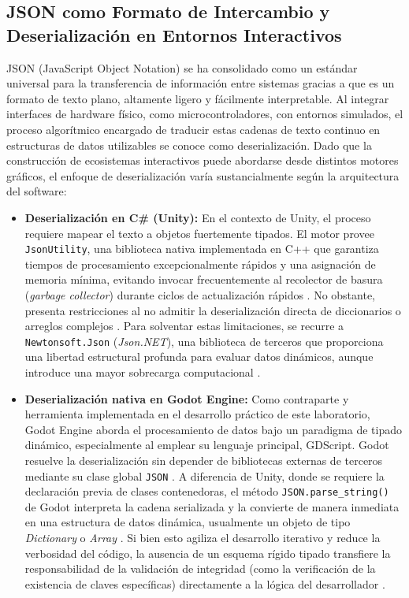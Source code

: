 \documentclass[journal]{IEEEtran}
\begin{document}
\subsection{JSON como Formato de Intercambio y Deserialización en Entornos Interactivos}
JSON (JavaScript Object Notation) se ha consolidado como un estándar universal para la transferencia de información entre sistemas gracias a que es un formato de texto plano, altamente ligero y fácilmente interpretable. Al integrar interfaces de hardware físico, como microcontroladores, con entornos simulados, el proceso algorítmico encargado de traducir estas cadenas de texto continuo en estructuras de datos utilizables se conoce como deserialización. Dado que la construcción de ecosistemas interactivos puede abordarse desde distintos motores gráficos, el enfoque de deserialización varía sustancialmente según la arquitectura del software:

\begin{itemize}
    \item \textbf{Deserialización en C\# (Unity):} En el contexto de Unity, el proceso requiere mapear el texto a objetos fuertemente tipados. El motor provee \texttt{JsonUtility}, una biblioteca nativa implementada en C++ que garantiza tiempos de procesamiento excepcionalmente rápidos y una asignación de memoria mínima, evitando invocar frecuentemente al recolector de basura (\textit{garbage collector}) durante ciclos de actualización rápidos \cite{unity2024}. No obstante, presenta restricciones al no admitir la deserialización directa de diccionarios o arreglos complejos \cite{unity2024}. Para solventar estas limitaciones, se recurre a \texttt{Newtonsoft.Json} (\textit{Json.NET}), una biblioteca de terceros que proporciona una libertad estructural profunda para evaluar datos dinámicos, aunque introduce una mayor sobrecarga computacional \cite{newtonsoft2024}.
    
    \item \textbf{Deserialización nativa en Godot Engine:} Como contraparte y herramienta implementada en el desarrollo práctico de este laboratorio, Godot Engine aborda el procesamiento de datos bajo un paradigma de tipado dinámico, especialmente al emplear su lenguaje principal, GDScript. Godot resuelve la deserialización sin depender de bibliotecas externas de terceros mediante su clase global \texttt{JSON} \cite{godot2024}. A diferencia de Unity, donde se requiere la declaración previa de clases contenedoras, el método \texttt{JSON.parse\_string()} de Godot interpreta la cadena serializada y la convierte de manera inmediata en una estructura de datos dinámica, usualmente un objeto de tipo \textit{Dictionary} o \textit{Array} \cite{godot2024}. Si bien esto agiliza el desarrollo iterativo y reduce la verbosidad del código, la ausencia de un esquema rígido tipado transfiere la responsabilidad de la validación de integridad (como la verificación de la existencia de claves específicas) directamente a la lógica del desarrollador \cite{godot2024}.
\end{itemize}
\end{document}
